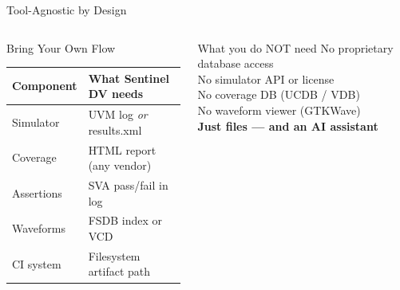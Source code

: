 \documentclass[aspectratio=169,t]{beamer}
\begin{document}
\begin{frame}[fragile]{Tool-Agnostic by Design}
\begin{columns}[T]
      \begin{block}{Bring Your Own Flow}
        \begin{tabular}{ll}
          \toprule
          \textbf{Component} & \textbf{What Sentinel DV needs} \\
          \midrule
          Simulator & UVM log \emph{or} results.xml \\
          Coverage & HTML report (any vendor) \\
          Assertions & SVA pass/fail in log \\
          Waveforms & FSDB index or VCD \\
          CI system & Filesystem artifact path \\
          \bottomrule
        \end{tabular}
      \end{block}
      \vspace{0.4em}
      \begin{alertblock}{What you do NOT need}
        \small
        No proprietary database access\\
        No simulator API or license\\
        No coverage DB (UCDB / VDB)\\
        No waveform viewer (GTKWave)\\
        \textbf{Just files — and an AI assistant}
      \end{alertblock}
  \end{columns}
\end{frame}
\end{document}

